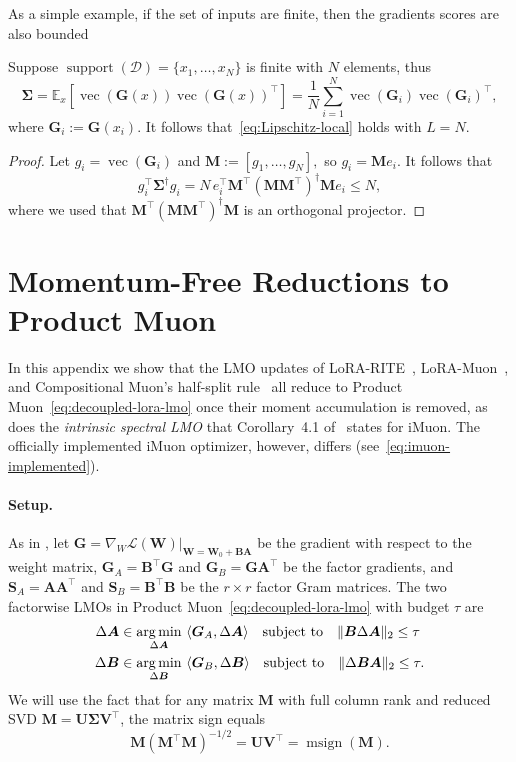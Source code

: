 \documentclass[11pt]{article}
\DeclareMathOperator{\support}{support}
\renewcommand{\vec}{\operatorname{vec}}
\newcommand{\mat}[1]{\bm{#1}}
\newcommand{\cD}{\mathcal{D}}
\newcommand{\EE}[2]{\mathbb{E}_{#1}\left[#2\right] }
\DeclareMathOperator*{\argmin}{arg\,min}
\newcommand{\ip}[1]{\langle #1 \rangle}
\DeclareMathOperator{\msign}{msign}          %
\newcommand{\norm}[1]{\| #1\|}
\begin{document}
As a simple example, if the set of inputs are finite, then the gradients scores are also bounded
\begin{lemma}\label{lem:finite-support}
Suppose $\support(\cD) = \{x_1,\dots,x_N\}$ is finite with $N$ elements, 
thus 
$$\mat{\Sigma} = \EE{x}{\vec(\mat{G}(x))\vec(\mat{G}(x))^\top} = \frac{1}{N}\sum_{i=1}^N \vec(\mat{G}_i)\vec(\mat{G}_i)^\top,$$
 where $\mat{G}_i := \mat{G}(x_i)$. It follows that~\eqref{eq:Lipschitz-local} holds with $L=N$.
\end{lemma}
\begin{proof}
Let $g_i = \vec(\mat{G}_i)$ and $\mat{M} := [g_1, \ldots, g_N],$ so $g_i = \mat{M} e_i.$ It follows that 
\[g_i^\top \mat{\Sigma}^{\dagger} g_i = N \,e_i^\top \mat{M}^\top (\mat{M} \mat{M}^\top)^{\dagger} \mat{M} e_i  \leq  N,\]
where we used that $ \mat{M}^\top (\mat{M} \mat{M}^\top)^{\dagger} \mat{M} $ is an orthogonal projector.
\end{proof}
\section{Momentum-Free Reductions to Product Muon}
\label{app:memoryless}
In this appendix we show that the LMO updates of LoRA-RITE~\cite{lorarite}, LoRA-Muon~\cite{loramuon}, and Compositional Muon's half-split rule~\cite{tilde_csd} all reduce to Product Muon~\eqref{eq:decoupled-lora-lmo} once their moment accumulation is removed, as does the \emph{intrinsic spectral LMO} that Corollary~4.1 of~\cite{imuon} states for iMuon. The officially implemented iMuon optimizer, however, differs (see~\eqref{eq:imuon-implemented}).


\paragraph{Setup.} As in , 
let $\mat{G}=\nabla_W \mathcal{L}(\mat{W}) \big |_{\mat{W}=\mat{W}_0+\mat{B}\mat{A}}$ be the gradient with respect to the weight matrix, $\mat{G}_A=\mat{B}^\top \mat{G}$ and $\mat{G}_B=\mat{G}\mat{A}^\top$ be the factor gradients, 
and $\mat{S}_A=\mat{A}\mat{A}^\top$ and
$\mat{S}_B=\mat{B}^\top \mat{B}$ be the $r\times r$ factor Gram matrices.
The two factorwise LMOs in Product Muon~\eqref{eq:decoupled-lora-lmo} with budget $\tau$ are
\begin{equation}
  \begin{aligned}
  \Delta\mat{A} &\in    \argmin_{\Delta\mat{A}}~ \ip{\mat{G}_A, \Delta\mat{A}} \quad \textnormal{subject to}\quad
\norm{\mat{B} \Delta\mat{A}}_2\le\tau \\
\Delta\mat{B} &\in   \argmin_{\Delta\mat{B}}~ \ip{\mat{G}_B,  \Delta\mat{B}} \quad \textnormal{subject to}\quad  \norm{\Delta\mat{B} \mat{A}}_2\le\tau.
  \end{aligned}
  \label{eq:decoupled-lora-lmo-app} 
\end{equation}
We will use the fact that for any matrix $\mat{M}$ with full column rank and reduced SVD $\mat{M}=\mat{U}\mat{\Sigma} \mat{V}^\top$,
the matrix sign equals
\begin{equation}
  \mat{M}(\mat{M}^\top \mat{M})^{-1/2}=
  \mat{U}\mat{V}^\top=\msign(\mat{M}).
  \label{eq:polar-id}
\end{equation}
\end{document}

